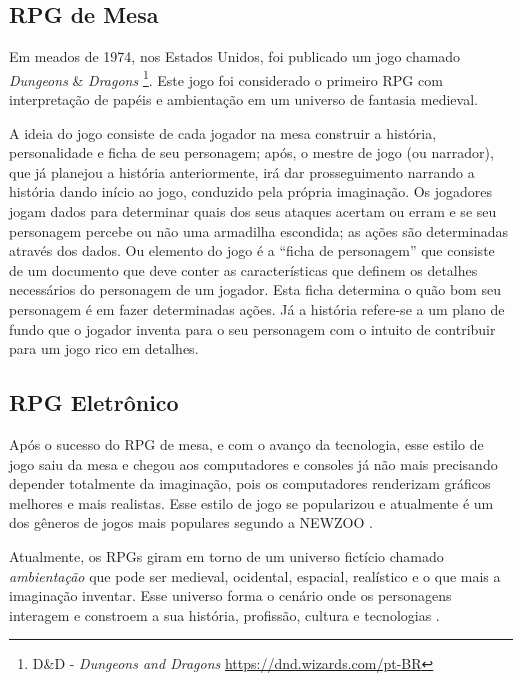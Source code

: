 \subsection{RPG de Mesa}
\label{sec:rpg-de-mesa}
Em meados de 1974, nos Estados Unidos, foi publicado um jogo chamado \textit{Dungeons} \& \textit{Dragons} \footnote{D\&D - \textit{Dungeons and Dragons} \url{https://dnd.wizards.com/pt-BR}}. Este jogo foi considerado o primeiro RPG com interpretação de papéis e ambientação em um universo de fantasia medieval.

A ideia do jogo consiste de cada jogador na mesa construir a história, personalidade e ficha de seu personagem; após, o mestre de jogo (ou narrador), que já planejou a história anteriormente, irá dar prosseguimento narrando a história dando início ao jogo, conduzido pela própria imaginação. Os jogadores jogam dados para determinar quais dos seus ataques acertam ou erram e se seu personagem percebe ou não uma armadilha escondida; as ações são determinadas através dos dados. Ou elemento do jogo é a ``ficha de personagem'' que consiste de um documento que deve conter as características que definem os detalhes necessários do personagem de um jogador. Esta ficha determina o quão bom seu personagem é em fazer determinadas ações. Já a história refere-se a um plano de fundo que o jogador inventa para o seu personagem com o intuito de contribuir para um jogo rico em detalhes. 

\subsection{RPG Eletrônico}
\label{sec:rpg-eletronico}
Após o sucesso do RPG de mesa, e com o avanço da tecnologia, esse estilo de jogo saiu da mesa e chegou aos computadores e consoles já não mais precisando depender totalmente da imaginação, pois os computadores renderizam gráficos melhores e mais realistas. Esse estilo de jogo se popularizou e atualmente é um dos gêneros de jogos mais populares segundo a NEWZOO \cite{NEWZOO}.

Atualmente, os RPGs giram em torno de um universo fictício chamado \textit{ambientação} que pode ser medieval, ocidental, espacial, realístico e o que mais a imaginação inventar. Esse universo forma o cenário onde os personagens interagem e constroem a sua história, profissão, cultura e tecnologias \cite{duflo1999jogo}.

